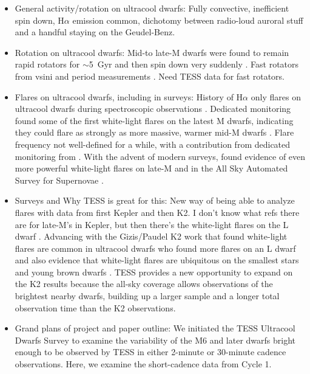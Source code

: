 \documentclass{aastex62}
\begin{document}
\begin{itemize}
\item General activity/rotation on ultracool dwarfs:
Fully convective, inefficient spin down, H$\alpha$ emission common, dichotomy between radio-loud auroral stuff and a handful staying on the Geudel-Benz.
\item Rotation on ultracool dwarfs: 
Mid-to late-M dwarfs were found to remain rapid rotators for $\sim$5~Gyr and then spin down very suddenly \citep{Newton2016}. Fast rotators from vsini \citep{Reiners2010} and period measurements \citep{Harding2013}. Need TESS data for fast rotators. 
\item Flares on ultracool dwarfs, including in surveys:
History of H$\alpha$ only flares on ultracool dwarfs during spectroscopic observations \citep{Liebert1999,Hall2002,Schmidt2007}. Dedicated monitoring found some of the first white-light flares on the latest M dwarfs, indicating they could flare as strongly as more massive, warmer mid-M dwarfs \citet{Rockenfeller2006,Stelzer2006}. Flare frequency not well-defined for a while, with a contribution from dedicated monitoring from \citet{Hilton2011phd}. With the advent of modern surveys, found evidence of even more powerful white-light flares on late-M \citep{Schmidt2014} and \citep{Schmidt2016a} in the All Sky Automated Survey for Supernovae \citep[][ASAS-SN]{Shappee2016a}. 
\item Surveys and Why TESS is great for this:
New way of being able to analyze flares with data from first Kepler and then K2. I don't know what refs there are for late-M's in Kepler, but then there's the white-light flares on the L dwarf \citep{Gizis2013}. Advancing with the Gizis/Paudel K2 work that found white-light flares are common in ultracool dwarfs who found more flares on an L dwarf and also evidence that white-light flares are ubiquitous on the smallest stars and young brown dwarfs \citep{Gizis2017,Gizis2017a,Paudel2017}. TESS provides a new opportunity to expand on the K2 results because the all-sky coverage allows observations of the brightest nearby dwarfs, building up a larger sample and a longer total observation time than the K2 observations. 
\item Grand plans of project and paper outline:
We initiated the TESS Ultracool Dwarfs Survey to examine the variability of the M6 and later dwarfs bright enough to be observed by TESS in either 2-minute or 30-minute cadence observations. Here, we examine the short-cadence data from Cycle 1. 

\end{itemize}
\end{document}
